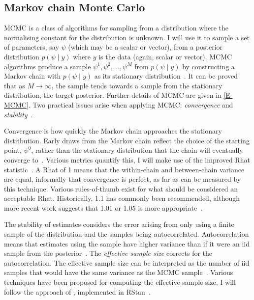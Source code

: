 \documentclass[thesis.tex]{subfiles}
\begin{document}
\subsection{Markov chain Monte Carlo} \label{intro:sec:MCMC}

MCMC is a class of algorithms for sampling from a distribution where the normalising constant for the distribution is unknown.
I will use it to sample a set of parameters, say $\psi$ (which may be a scalar or vector), from a posterior distribution $p(\psi \mid y)$ where $y$ is the data (again, scalar or vector).
MCMC algorithms produce a sample $\psi^1, \psi^2, \dots, \psi^M$ from $p(\psi \mid y)$ by constructing a Markov chain with $p(\psi \mid y)$ as its stationary distribution~\autocite[275]{gelmanBDA}.
It can be proved that as $M\to\infty$, the sample tends towards a sample from the stationary distribution, \ie the target posterior.
Further details of MCMC are given in \cref{E-MCMC}.
Two practical issues arise when applying MCMC: \emph{convergence} and \emph{stability}~\autocite[72]{lunnBUGS}.

Convergence is how quickly the Markov chain approaches the stationary distribution.
Early draws from the Markov chain reflect the choice of the starting point, $\psi^0$, rather than the stationary distribution that the chain will eventually converge to~\autocite[282]{gelmanBDA}.
Various metrics quantify this, I will make use of the improved Rhat statistic~\autocite{vehtariRhat}.
A Rhat of 1 means that the within-chain and between-chain variance are equal, informally that convergence is perfect, as far as can be measured by this technique.
Various rules-of-thumb exist for what should be considered an acceptable Rhat.
Historically, 1.1 has commonly been recommended, although more recent work suggests that 1.01 or 1.05 is more appropriate~\autocite{vehtariRhat}.

The stability of estimates considers the error arising from only using a finite sample of the distribution and the samples being autocorrelated.
Autocorrelation means that estimates using the sample have higher variance than if it were an iid sample from the posterior~\autocite[286]{gelmanBDA}.
The \emph{effective sample size} corrects for the autocorrelation.
The effective sample size can be interpreted as the number of iid samples that would have the same variance as the MCMC sample~\autocites[286]{gelmanBDA}{vehtariRhat}.
Various techniques have been proposed for computing the effective sample size, I will follow the approach of \textcite{vehtariRhat}, implemented in RStan~\autocite{RStan-2-32-3}.
\end{document}
